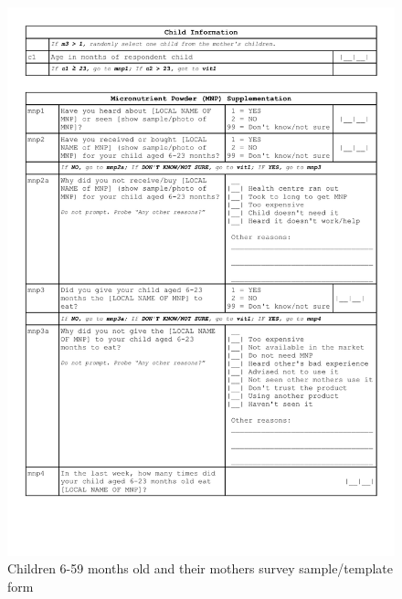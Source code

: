 \documentclass[12pt,a4paper]{book}
\theoremstyle{definition}
\theoremstyle{definition}
\theoremstyle{definition}
\theoremstyle{remark}
\begin{document}
\begin{figure}[H]
{\centering \includegraphics[width=29.15in]{forms/childForm3} 

}

\caption{Children 6-59 months old and their mothers survey sample/template form}\label{fig:childform}
\end{figure}\begin{figure}[H]


\end{figure}
\end{document}

